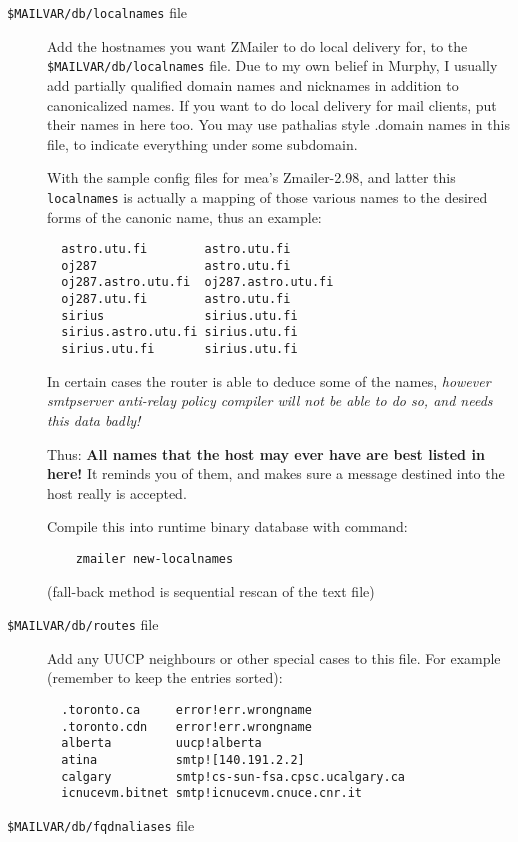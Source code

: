 \begin{description}
\item[{\tt \$MAILVAR/db/localnames} file] \mbox{}

Add the hostnames you want ZMailer to do local delivery for, to the
{\tt \$MAILVAR/db/localnames} file.  Due to my own belief in Murphy,
I usually add partially qualified domain names and nicknames in
addition to canonicalized names.  If you want to do local delivery
for mail clients, put their names in here too.  You may use pathalias 
style .domain names in this file, to indicate everything under some
subdomain.

With the sample config files for mea's Zmailer-2.98, and latter
this {\tt localnames} is actually a mapping of those various names to
the desired forms of the canonic name, thus an example:
\begin{verbatim}
  astro.utu.fi        astro.utu.fi
  oj287               astro.utu.fi
  oj287.astro.utu.fi  oj287.astro.utu.fi
  oj287.utu.fi        astro.utu.fi
  sirius              sirius.utu.fi
  sirius.astro.utu.fi sirius.utu.fi
  sirius.utu.fi       sirius.utu.fi
\end{verbatim}

In certain cases the router is able to deduce some of the names,
{\em however smtpserver anti-relay policy compiler will not be able
 to do so, and needs this data badly!}

Thus: {\bf All names that the host may ever have are best listed in here!}
It reminds you of them, and makes sure a message destined into the host
really is accepted.

Compile this into runtime binary database with command:
\begin{verbatim}
    zmailer new-localnames
\end{verbatim}
(fall-back method is sequential rescan of the text file)

\item[{\tt \$MAILVAR/db/routes} file] \mbox{}

Add any UUCP neighbours or other special cases to this file.  For
example (remember to keep the entries sorted):
\begin{verbatim}
  .toronto.ca     error!err.wrongname
  .toronto.cdn    error!err.wrongname
  alberta         uucp!alberta
  atina           smtp![140.191.2.2]
  calgary         smtp!cs-sun-fsa.cpsc.ucalgary.ca
  icnucevm.bitnet smtp!icnucevm.cnuce.cnr.it
\end{verbatim}

\item[{\tt \$MAILVAR/db/fqdnaliases} file] \mbox{}


\end{description}
